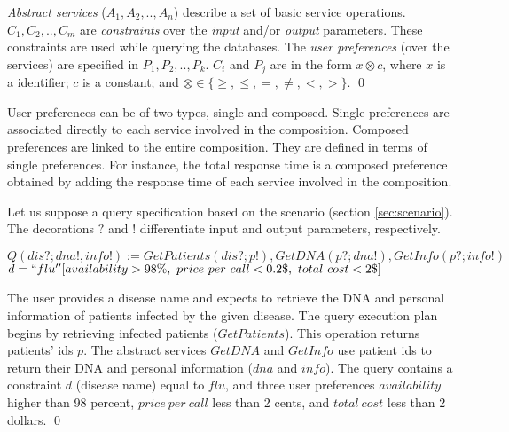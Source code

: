 \begin{definition}[query]
\textit{Abstract services} ($A_{1}, A_{2}, .., A_{n}$) describe a set of basic
service operations.
%
$C_{1}, C_{2}, .., C_{m}$ are \textit{constraints} over the \textit{input} and/or \textit{output} parameters. These constraints are used while querying the databases. 
The \textit{user preferences} (over the services) are specified in $P_{1}, P_{2}, .., P_{k}$.  
%
$C_{i}$ and $P_{j}$ are in the form $x \otimes c$, where $x$ is a identifier; $c$ is a constant; and
$\otimes \in\lbrace \geq, \leq, =, \neq, <, >\rbrace$.
%
\qed
\end{definition}

User preferences can be of two types, single and composed. Single preferences
are associated directly to each service involved in the composition. Composed
preferences are linked to the entire composition. They are defined in terms of
single preferences. For instance, the total response time is a composed
preference obtained by adding the response time of each service involved in the composition.

\begin{example}
%
Let us suppose a query specification based on the scenario (section \ref{sec:scenario}). The decorations $?$ and $!$ differentiate input and output parameters, respectively. 
%
\begin{center}
\small
$Q(dis?; dna!, info!) := GetPatients(dis?; p!), GetDNA(p?; dna!), GetInfo(p?; info!)$
\\
$d = ``flu'' [availability > 98\%, \ price \ per \ call < 0.2\$, \ total \ cost < 2\$]$
\end{center}
%
The user provides a disease name and expects to retrieve the DNA and personal
information of patients infected by the given disease. The query execution plan
begins by retrieving infected patients ($GetPatients$). This operation returns patients' ids $p$. The abstract services $GetDNA$ and $GetInfo$ use patient ids to return their DNA and personal information ($dna$ and $info$).
The query contains a constraint $d$ (disease name) equal to $flu$, and three user preferences $availability$ higher than 98 percent, $price \ per \ call$ less than 2 cents, and $total \ cost$ less than 2 dollars.
\qed
\end{example}

